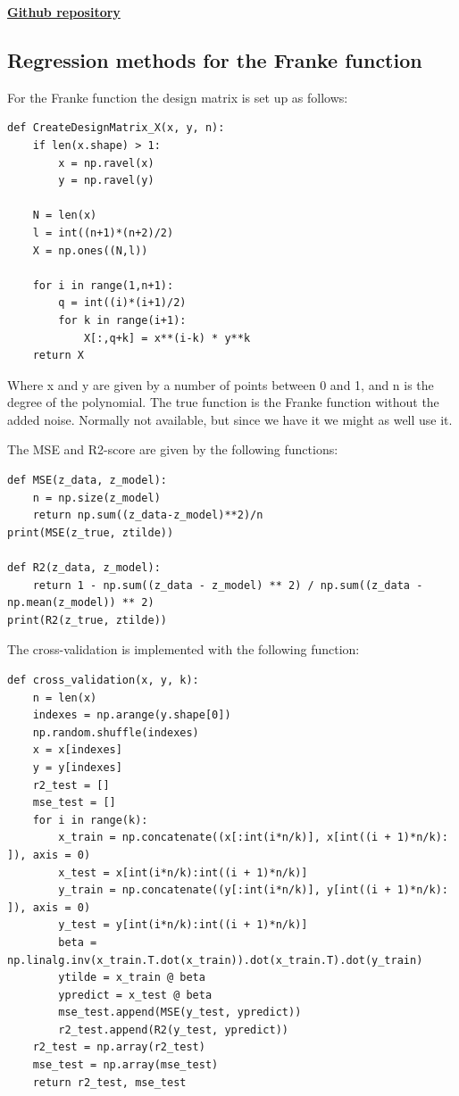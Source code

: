 \documentclass[12pt]{extarticle}
\begin{document}
\begin{center}
    \href{https://github.com/jolyndev/FYS-STK4155}{\textbf{Github repository}}
\end{center}

\subsection{Regression methods for the Franke function}

For the Franke function the design matrix is set up as follows: 

\begin{lstlisting}
def CreateDesignMatrix_X(x, y, n):
    if len(x.shape) > 1:
        x = np.ravel(x)
        y = np.ravel(y)
        
    N = len(x)
    l = int((n+1)*(n+2)/2)
    X = np.ones((N,l))
        
    for i in range(1,n+1):
        q = int((i)*(i+1)/2)
        for k in range(i+1):
            X[:,q+k] = x**(i-k) * y**k
    return X
\end{lstlisting}

Where x and y are given by a number of points between 0 and 1, and n is the degree of the polynomial.
The true function is the Franke function without the added noise. Normally not available, but since we have it we might as well use it.

The MSE and R2-score are given by the following functions:

\begin{lstlisting}
def MSE(z_data, z_model):
    n = np.size(z_model)
    return np.sum((z_data-z_model)**2)/n
print(MSE(z_true, ztilde))

def R2(z_data, z_model):
    return 1 - np.sum((z_data - z_model) ** 2) / np.sum((z_data - np.mean(z_model)) ** 2)
print(R2(z_true, ztilde))

\end{lstlisting}

The cross-validation is implemented with the following function:

\begin{lstlisting}
def cross_validation(x, y, k):
    n = len(x)
    indexes = np.arange(y.shape[0])
    np.random.shuffle(indexes)
    x = x[indexes]
    y = y[indexes]
    r2_test = []
    mse_test = []
    for i in range(k):
        x_train = np.concatenate((x[:int(i*n/k)], x[int((i + 1)*n/k): ]), axis = 0)
        x_test = x[int(i*n/k):int((i + 1)*n/k)]
        y_train = np.concatenate((y[:int(i*n/k)], y[int((i + 1)*n/k): ]), axis = 0)
        y_test = y[int(i*n/k):int((i + 1)*n/k)]
        beta = np.linalg.inv(x_train.T.dot(x_train)).dot(x_train.T).dot(y_train)
        ytilde = x_train @ beta
        ypredict = x_test @ beta
        mse_test.append(MSE(y_test, ypredict))
        r2_test.append(R2(y_test, ypredict))
    r2_test = np.array(r2_test)
    mse_test = np.array(mse_test)
    return r2_test, mse_test

\end{lstlisting}
\end{document}
